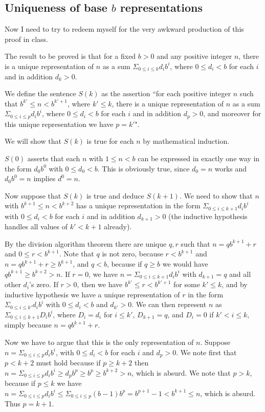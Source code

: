 \documentclass[12pt]{article}
\begin{document}
\subsection{Uniqueness of base $b$ representations}

Now I need to try to redeem myself for the very awkward production of this proof in class.

The result to be proved is that for a fixed $b>0$ and any positive integer $n$, there is a unique representation
of $n$ as a sum $\Sigma_{0 \leq i \leq k}d_ib^i$, where $0 \leq d_i <b$ for each $i$ and in addition $d_k>0$.

We define the sentence $S(k)$ as the assertion ``for each positive integer $n$ such that $b^{k'} \leq n < b^{k'+1}$, where $k' \leq k$,
there is a unique representation
of $n$ as a sum $\Sigma_{0 \leq i \leq p}d_ib^i$, where $0 \leq d_i <b$ for each $i$ and in addition $d_{p}>0$, and moreover for this unique representation we have $p=k'$".

We will show that $S(k)$ is true for each $n$ by mathematical induction.

$S(0)$ asserts that each $n$ with $1 \leq n <b$ can be expressed in exactly one way in the form $d_0b^0$ with
$0 \leq d_0 <b$.  This is obviously true, since $d_0  = n$ works and $d_0b^0 = n$ implies $d^0 =n$.

Now suppose that $S(k)$ is true and deduce $S(k+1)$.  We need to show that $n$ with $b^{k+1} \leq n <b^{k+2}$
has a unique representation in the form $\Sigma_{0 \leq i \leq k+1}d_ib^i$ with $0 \leq d_i <b$ for each $i$ and in addition $d_{k+1}>0$ (the inductive hypothesis handles all values of $k' < k+1$ already).

By the division algorithm theorem there are unique $q,r$ such that $n=qb^{k+1}+r$ and $0 \leq r <b^{k+1}$.  Note that $q$ is not zero, because $r<b^{k+1}$ and $n=qb^{k+1}+r \geq b^{k+1}$, and $q < b$, because if $q\geq b$ we would have
$qb^{k+1} \geq b^{k+2} >n$.
If $r=0$, we have $n=\Sigma_{0 \leq i \leq k+1}d_ib^i$ with $d_{k+1} = q$ and all other $d_i$'s zero.
If $r>0$, then we have  $b^{k'} \leq r < b^{k'+1}$ for some $k' \leq k$, and by inductive hypothesis we have
a unique representation of $r$ in the form $\Sigma_{0 \leq i \leq k'}d_ib^i$ with $0 \leq d_i < b$ and $d_{k'}>0$.
We can then represent $n$ as $\Sigma_{0 \leq i \leq k+1}D_ib^i$, where $D_i = d_i$ for $i \leq k'$, $D_{k+1}=q$,
and $D_i=0$ if $k' <i\leq k$, simply because $n=qb^{k+1} + r$.

Now we have to argue that this is the only representation of $n$.  Suppose $n = \Sigma_{0 \leq i \leq p}d_ib^i$, with
$0 \leq d_i < b$ for each $i$ and $d_p >0$.  We note first that $p < k+2$ must hold because if $p\geq k+2$ then
$n = \Sigma_{0 \leq i \leq p}d_ib^i \geq d_pb^p \geq b^p \geq b^{k+2}>n$, which is absurd.  We note
that $p >k$, because if $p \leq k$ we have $n = \Sigma_{0 \leq i \leq p}d_ib^i \leq \Sigma_{0 \leq i \leq p}(b-1)b^p = b^{p+1}-1 < b^{k+1} \leq n$, which is absurd.  Thus $p=k+1$.
\end{document}
